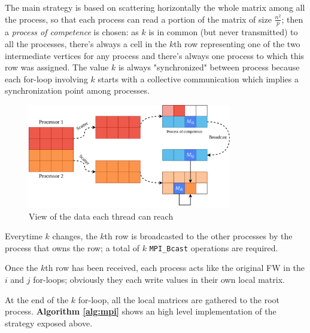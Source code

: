 The main strategy is based on scattering horizontally the whole matrix among all the process, so that
each process can read a portion of the matrix of size $\frac{n^2}{p}$; then a \emph{process of competence}
is chosen: as $k$ is in common (but never transmitted) to all the processes, there's always a cell in the $k$th
row representing one of the two intermediate vertices for any process and there's always one process to which this row was assigned.
The value $k$ is always "synchronized" between process because each for-loop involving $k$ starts with a collective communication
which implies a synchronization point among processes.

\begin{figure}[h!]
\centering                                                                        
\includegraphics[width=3.5in]{diagrams/mpi-scatter}
\captionsetup{justification=centering}                                                                                                                                   
\caption{View of the data each thread can reach}                                                                                                                                            
\label{fig:threads}                                                                                                                                                           
\end{figure}
Everytime $k$ changes, the $k$th row is broadcasted to the other processes by the process that owns the row;
a total of $k$ \texttt{MPI\_Bcast} operations are required. \par
Once the $k$th row has been received, each process acts like the original FW in the $i$ and $j$ for-loops; obviously
they each write values in their own local matrix. \par

At the end of the $k$ for-loop, all the local matrices are gathered to the root process. 
\textbf{Algorithm \ref*{alg:mpi}} shows an high level implementation of the strategy exposed above.\par

